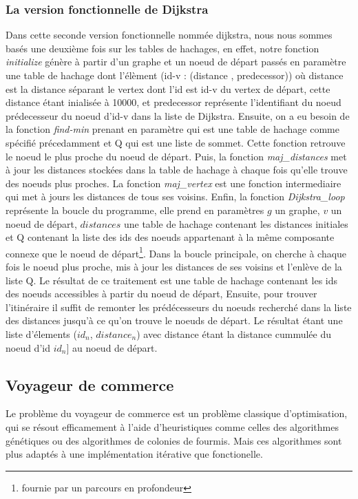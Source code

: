 \documentclass[french]{article}
\begin{document}
\subsubsection{La version fonctionnelle de Dijkstra}
Dans cette seconde version fonctionnelle nommée dijkstra, nous nous sommes basés une deuxième fois sur les tables de hachages, en effet, notre fonction \textit{initialize} génère à partir d'un graphe et un noeud de départ passés en paramètre une table de hachage dont l'élèment (id-v : (distance , predecessor)) o\`u distance est la distance séparant le vertex dont l'id est id-v du vertex de départ, cette distance étant inialisée à 10000, et predecessor représente l'identifiant du noeud prédecesseur du noeud d'id-v dans la liste de Dijkstra. Ensuite, on a eu besoin de la fonction \textit{find-min} prenant en paramètre  qui est une table de hachage comme spécifié précedamment et Q qui est une liste de sommet. Cette fonction  retrouve le noeud le plus proche du noeud de départ. Puis, la fonction  \textit{maj\_distances} met à jour les distances stockées dans la table de hachage à chaque fois qu'elle trouve des noeuds plus proches. La fonction \textit{maj\_vertex} est une fonction intermediaire qui met à jours les distances de tous ses voisins. 
\newline 
Enfin, la fonction \textit{Dijkstra\_loop} représente la boucle du programme, elle prend en paramètres $g$ un graphe, $v$ un noeud de départ, $distances$ une table de hachage contenant les distances initiales et Q contenant la liste des ids des noeuds appartenant à la même composante connexe que le noeud de départ\footnote{fournie par un parcours en profondeur}. Dans la boucle principale, on cherche à chaque fois le noeud plus proche, mis à jour les distances de ses voisins et l'enlève de la liste Q.
Le résultat de ce traitement est une table de hachage contenant les ids des noeuds accessibles à partir du noeud de départ, Ensuite, pour trouver l'itinéraire il suffit de remonter les prédécesseurs du noeuds recherché dans la liste des distances jusqu'à ce qu'on trouve le noeuds de départ. Le résultat étant une liste d'élements ($id_{n}$, $distance_{n}$) avec distance étant la distance cummulée du noeud d'id $id_{n}]$ au noeud de départ. 

\subsection{Voyageur de commerce} %
Le problème du voyageur de commerce est un problème classique d'optimisation, qui se résout efficamement à l'aide d'heuristiques comme celles des algorithmes génétiques ou des algorithmes de colonies de fourmis. Mais ces algorithmes sont plus adaptés à une implémentation itérative que fonctionelle.
\newline
\end{document}
